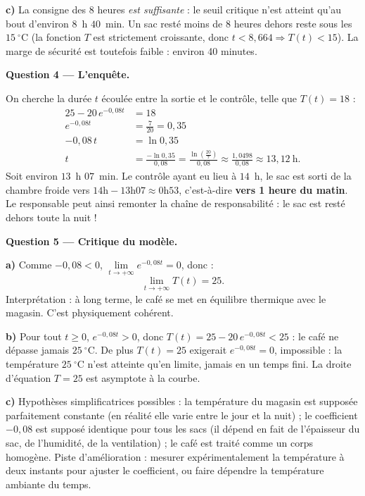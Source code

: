 \documentclass[11pt]{article}
\begin{document}
\begin{exoresolu}
\textbf{c)} La consigne des 8 heures \emph{est suffisante} : le seuil critique n'est atteint qu'au bout d'environ $8$~h $40$~min. Un sac resté moins de 8 heures dehors reste sous les $15~^\circ\mathrm{C}$ (la fonction $T$ est strictement croissante, donc $t < 8{,}664 \Rightarrow T(t) < 15$). La marge de sécurité est toutefois faible : environ 40 minutes.

\textbf{Question 4 — L'enquête.}

On cherche la durée $t$ écoulée entre la sortie et le contrôle, telle que $T(t) = 18$ :
\begin{align*}
25 - 20\,e^{-0{,}08t} &= 18 \\
e^{-0{,}08t} &= \frac{7}{20} = 0{,}35 \\
-0{,}08\,t &= \ln 0{,}35 \\
t &= \frac{-\ln 0{,}35}{0{,}08} = \frac{\ln\!\left(\frac{20}{7}\right)}{0{,}08} \approx \frac{1{,}0498}{0{,}08} \approx 13{,}12~\mathrm{h}.
\end{align*}
Soit environ $13$~h $07$~min. Le contrôle ayant eu lieu à $14$~h, le sac est sorti de la chambre froide vers $14\mathrm{h} - 13\mathrm{h}07 \approx 0\mathrm{h}53$, c'est-à-dire \textbf{vers 1 heure du matin}. Le responsable peut ainsi remonter la chaîne de responsabilité : le sac est resté dehors toute la nuit !

\textbf{Question 5 — Critique du modèle.}

\textbf{a)} Comme $-0{,}08 < 0$, $\lim\limits_{t \to +\infty} e^{-0{,}08t} = 0$, donc :
\[ \lim_{t \to +\infty} T(t) = 25. \]
Interprétation : à long terme, le café se met en équilibre thermique avec le magasin. C'est physiquement cohérent.

\textbf{b)} Pour tout $t \geq 0$, $e^{-0{,}08t} > 0$, donc $T(t) = 25 - 20\,e^{-0{,}08t} < 25$ : le café ne dépasse jamais $25~^\circ\mathrm{C}$. De plus $T(t) = 25$ exigerait $e^{-0{,}08t} = 0$, impossible : la température $25~^\circ\mathrm{C}$ n'est atteinte qu'en limite, jamais en un temps fini. La droite d'équation $T = 25$ est asymptote à la courbe.

\textbf{c)} Hypothèses simplificatrices possibles : la température du magasin est supposée parfaitement constante (en réalité elle varie entre le jour et la nuit) ; le coefficient $-0{,}08$ est supposé identique pour tous les sacs (il dépend en fait de l'épaisseur du sac, de l'humidité, de la ventilation) ; le café est traité comme un corps homogène. Piste d'amélioration : mesurer expérimentalement la température à deux instants pour ajuster le coefficient, ou faire dépendre la température ambiante du temps.
\end{exoresolu}
\end{document}
